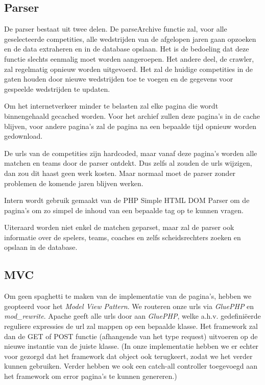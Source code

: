 \documentclass[11pt]{article}
\begin{document}
\subsection{Parser}

De parser bestaat uit twee delen. De parseArchive functie zal, voor alle geselecteerde competities, alle wedstrijden van de afgelopen jaren gaan opzoeken en de data extraheren en in de database opslaan. Het is de bedoeling dat deze functie slechts eenmalig moet worden aangeroepen. Het andere deel, de crawler, zal regelmatig opnieuw worden uitgevoerd. Het zal de huidige competities in de gaten houden door nieuwe wedstrijden toe te voegen en de gegevens voor gespeelde wedstrijden te updaten.

Om het internetverkeer minder te belasten zal elke pagina die wordt binnengehaald gecached worden. Voor het archief zullen deze pagina's in de cache blijven, voor andere pagina's zal de pagina na een bepaalde tijd opnieuw worden gedownload.

De urls van de competities zijn hardcoded, maar vanaf deze pagina's worden alle matchen en teams door de parser ontdekt. Dus zelfs al zouden de urls wijzigen, dan zou dit haast geen werk kosten. Maar normaal moet de parser zonder problemen de komende jaren blijven werken.

Intern wordt gebruik gemaakt van de PHP Simple HTML DOM Parser om de pagina's om zo simpel de inhoud van een bepaalde tag op te kunnen vragen.

Uiteraard worden niet enkel de matchen geparset, maar zal de parser ook informatie over de spelers, teams, coaches en zelfs scheidsrechters zoeken en opslaan in de database.


\subsection{MVC}

Om geen spaghetti te maken van de implementatie van de pagina's, hebben we geopteerd voor het \emph{Model View Pattern}. We routeren onze urls via \emph{GluePHP} en \emph{mod\_rewrite}. Apache geeft alle urls door aan \emph{GluePHP}, welke a.h.v. gedefini\"eerde reguliere expressies de url zal mappen op een bepaalde klasse. Het framework zal dan de GET of POST functie (afhangende van het type request) uitvoeren op de nieuwe instantie van de juiste klasse. (In onze implementatie hebben we er echter voor gezorgd dat het framework dat object ook terugkeert, zodat we het verder kunnen gebruiken. Verder hebben we ook een catch-all controller toegevoegd aan het framework om error pagina's te kunnen genereren.)
\end{document}
